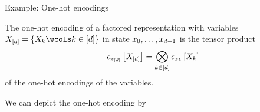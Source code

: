 \documentclass{beamer}
\begin{document}
    \begin{frame}{Example: One-hot encodings}
        \begin{definition}
            The one-hot encoding of a factored representation with variables $\shortcatvariables=\{\catvariableof{\atomenumerator} \wcols \atomenumeratorin \}$ in state $x_{0},\ldots,x_{d-1}$ is the tensor product
            \begin{align*}
                \epsilon_{x_{[d]}}\left[X_{[d]}\right]
                = \bigotimes_{k\in[d]} \epsilon_{x_{k}}\left[X_{k}\right]
            \end{align*}
            of the one-hot encodings of the variables.
        \end{definition}
        We can depict the one-hot encoding by
        \begin{center}
            
        \end{center}
    \end{frame}
\end{document}
